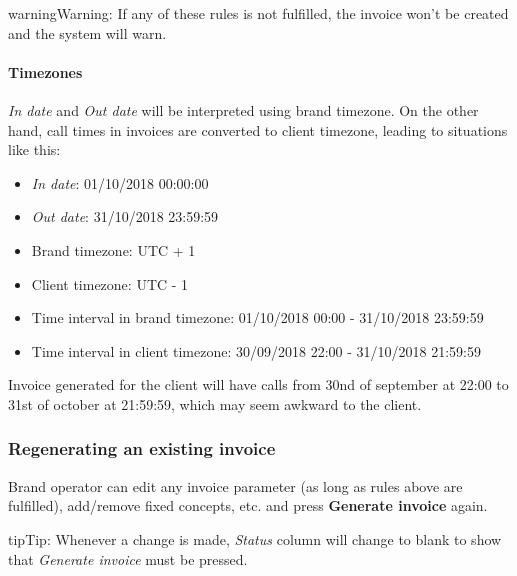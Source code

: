 \documentclass[letterpaper,10pt,english]{sphinxmanual}
\begin{document}
\begin{notice}{warning}{Warning:}
If any of these rules is not fulfilled, the invoice won't be created and the system will warn.
\end{notice}


\paragraph{Timezones}
\label{administration_portal/brand/invoicing/invoices:timezones}
\emph{In date} and \emph{Out date} will be interpreted using brand timezone. On the other hand, call times in invoices are converted
to client timezone, leading to situations like this:
\begin{itemize}
\item {} 
\emph{In date}: 01/10/2018 00:00:00

\item {} 
\emph{Out date}: 31/10/2018 23:59:59

\item {} 
Brand timezone: UTC + 1

\item {} 
Client timezone: UTC - 1

\item {} 
Time interval in brand timezone: 01/10/2018 00:00 - 31/10/2018 23:59:59

\item {} 
Time interval in client timezone: 30/09/2018 22:00 - 31/10/2018 21:59:59

\end{itemize}

Invoice generated for the client will have calls from 30nd of september at 22:00 to 31st of october at 21:59:59, which
may seem awkward to the client.


\subsubsection{Regenerating an existing invoice}
\label{administration_portal/brand/invoicing/invoices:regenerating-an-existing-invoice}
Brand operator can edit any invoice parameter (as long as rules above are fulfilled), add/remove fixed concepts, etc. and
press \textbf{Generate invoice} again.

\begin{notice}{tip}{Tip:}
Whenever a change is made, \emph{Status} column will change to blank to show that \emph{Generate invoice} must be pressed.
\end{notice}
\end{document}
